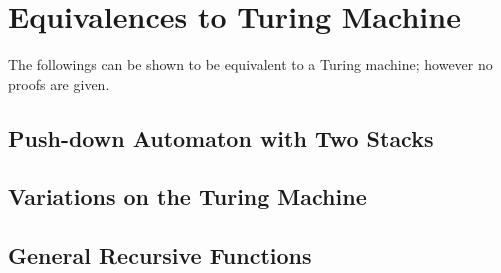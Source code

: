 \documentclass{report}
\begin{document}
		
		\section{Equivalences to Turing Machine}
			The followings can be shown to be equivalent to a Turing machine; however no proofs are given.
			\subsection{Push-down Automaton with Two Stacks}
			
			\subsection{Variations on the Turing Machine} \label{var_TM}
			
			\subsection{General Recursive Functions}
\end{document}
